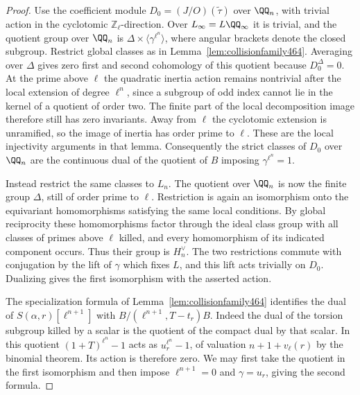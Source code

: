 \documentclass[a4paper,11pt]{article}
\theoremstyle{definition}
\theoremstyle{remark}
\newcommand{\ZZ}{\mathbb Z}\newcommand{\ord}{\operatorname{ord}}
\numberwithin{equation}{section}
\begin{document}
\begin{proof}
Use the coefficient module \(D_0=(J/O)(\widetilde\tau)\) over
\(\QQ_n\), with trivial action in the cyclotomic
\(\ZZ_\ell\)-direction. Over \(L_\infty=L\QQ_\infty\) it is
trivial, and the quotient group over \(\QQ_n\) is
\(\Delta\times\langle\gamma^{\ell^n}\rangle\), where angular
brackets denote the closed subgroup. Restrict global classes as
in Lemma~\ref{lem:collisionfamily464}. Averaging over \(\Delta\)
gives zero first and second cohomology of this quotient because
\(D_0^\Delta=0\). At the prime above \(\ell\) the quadratic
inertia action remains nontrivial after the local extension
of degree \(\ell^n\), since a subgroup of odd index cannot lie
in the kernel of a quotient of order two. The finite part of
the local decomposition image therefore still has zero
invariants. Away from \(\ell\) the cyclotomic extension is
unramified, so the image of inertia has order prime to \(\ell\).
These are the local injectivity arguments in that lemma.
Consequently the strict classes of \(D_0\) over \(\QQ_n\) are
the continuous dual of the quotient of \(B\) imposing
\(\gamma^{\ell^n}=1\).

Instead restrict the same classes to \(L_n\). The quotient
over \(\QQ_n\) is now the finite group \(\Delta\), still of
order prime to \(\ell\). Restriction is again an isomorphism
onto the equivariant homomorphisms satisfying the same local
conditions. By global reciprocity these homomorphisms factor
through the ideal class group with all classes of primes above
\(\ell\) killed, and every homomorphism of its indicated component
occurs. Thus their group is \(H_n^\vee\). The two restrictions
commute with conjugation by the lift of \(\gamma\) which fixes
\(L\), and this lift acts trivially on \(D_0\). Dualizing gives
the first isomorphism with the asserted action.

The specialization formula of Lemma~\ref{lem:collisionfamily464}
identifies the dual of \(S(\alpha,r)[\ell^{n+1}]\) with
\(B/(\ell^{n+1},T-t_r)B\). Indeed the dual of the torsion
subgroup killed by a scalar is the quotient of the compact dual
by that scalar. In this quotient \((1+T)^{\ell^n}-1\) acts as
\(u_r^{\ell^n}-1\), of valuation \(n+1+v_\ell(r)\) by the
binomial theorem. Its action is therefore zero. We may first
take the quotient in the first isomorphism and then impose
\(\ell^{n+1}=0\) and \(\gamma=u_r\), giving the second formula.
\end{proof}
\end{document}
